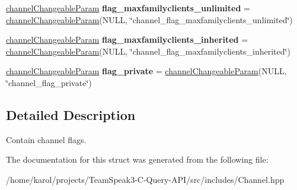 \begin{DoxyCompactItemize}
\item 
\hyperlink{struct_ts3_api_1_1_channel_1_1channel_changeable_param}{channel\+Changeable\+Param} {\bfseries flag\+\_\+maxfamilyclients\+\_\+unlimited} = \hyperlink{struct_ts3_api_1_1_channel_1_1channel_changeable_param}{channel\+Changeable\+Param}(N\+U\+LL, \char`\"{}channel\+\_\+flag\+\_\+maxfamilyclients\+\_\+unlimited\char`\"{})\hypertarget{struct_ts3_api_1_1_channel_1_1channel_flags_a4c7b3a5415749ae58828b1c4cbeddedd}{}\label{struct_ts3_api_1_1_channel_1_1channel_flags_a4c7b3a5415749ae58828b1c4cbeddedd}

\item 
\hyperlink{struct_ts3_api_1_1_channel_1_1channel_changeable_param}{channel\+Changeable\+Param} {\bfseries flag\+\_\+maxfamilyclients\+\_\+inherited} = \hyperlink{struct_ts3_api_1_1_channel_1_1channel_changeable_param}{channel\+Changeable\+Param}(N\+U\+LL, \char`\"{}channel\+\_\+flag\+\_\+maxfamilyclients\+\_\+inherited\char`\"{})\hypertarget{struct_ts3_api_1_1_channel_1_1channel_flags_aff6c5c0b0bc8a01ebc33066a93d5d237}{}\label{struct_ts3_api_1_1_channel_1_1channel_flags_aff6c5c0b0bc8a01ebc33066a93d5d237}

\item 
\hyperlink{struct_ts3_api_1_1_channel_1_1channel_changeable_param}{channel\+Changeable\+Param} {\bfseries flag\+\_\+private} = \hyperlink{struct_ts3_api_1_1_channel_1_1channel_changeable_param}{channel\+Changeable\+Param}(N\+U\+LL, \char`\"{}channel\+\_\+flag\+\_\+private\char`\"{})\hypertarget{struct_ts3_api_1_1_channel_1_1channel_flags_a2c3f5277269123eb04e11a03aafe9937}{}\label{struct_ts3_api_1_1_channel_1_1channel_flags_a2c3f5277269123eb04e11a03aafe9937}

\end{DoxyCompactItemize}


\subsection{Detailed Description}
Contain channel flags. 

The documentation for this struct was generated from the following file\+:\begin{DoxyCompactItemize}
\item 
/home/karol/projects/\+Team\+Speak3-\/\+C-\/\+Query-\/\+A\+P\+I/src/includes/Channel.\+hpp\end{DoxyCompactItemize}
